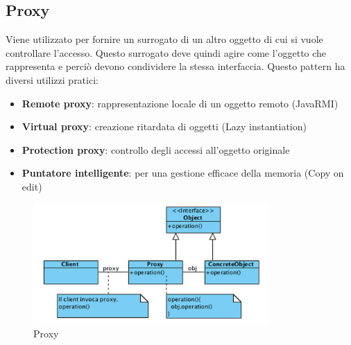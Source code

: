 \subsection{Proxy}
Viene utilizzato per fornire un surrogato di un altro oggetto di cui si vuole controllare l’accesso. Questo surrogato deve quindi agire come l’oggetto che rappresenta e perciò devono condividere la stessa interfaccia.
Questo pattern ha diversi utilizzi pratici:
\begin{itemize}
\item \textbf{Remote proxy}: rappresentazione locale di un oggetto remoto (JavaRMI)
\item \textbf{Virtual proxy}: creazione ritardata di oggetti (Lazy instantiation)
\item \textbf{Protection proxy}: controllo degli accessi all’oggetto originale
\item \textbf{Puntatore intelligente}: per una gestione efficace della memoria (Copy on edit)
\end{itemize}
\begin{figure}[ht]
    \centering
    \includegraphics[width=0.8\textwidth]{immagini/proxy.png}
    \caption{Proxy}
\end{figure}
\FloatBarrier

